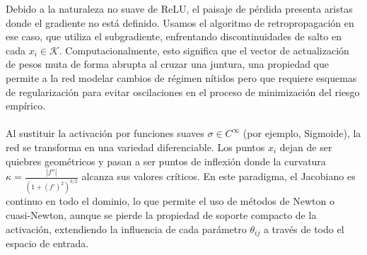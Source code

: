 \documentclass{article}
\begin{document}
Debido a la naturaleza no suave de ReLU, el paisaje de pérdida presenta aristas donde el gradiente no está definido. Usamos el algoritmo de retropropagación en ese caso, que utiliza el subgradiente, enfrentando discontinuidades de salto en cada $x_i \in \mathcal{K}$. Computacionalmente, esto significa que el vector de actualización de pesos muta de forma abrupta al cruzar una juntura, una propiedad que permite a la red modelar cambios de régimen nítidos pero que requiere esquemas de regularización para evitar oscilaciones en el proceso de minimización del riesgo empírico. \\ \\
Al sustituir la activación por funciones suaves $\sigma \in C^\infty$ (por ejemplo, Sigmoide), la red se transforma en una variedad diferenciable. Los puntos $x_i$ dejan de ser quiebres geométricos y pasan a ser puntos de inflexión donde la curvatura $\kappa = \frac{|f''|}{(1+(f')^2)^{3/2}}$ alcanza sus valores críticos. En este paradigma, el Jacobiano es continuo en todo el dominio, lo que permite el uso de métodos de Newton o cuasi-Newton, aunque se pierde la propiedad de soporte compacto de la activación, extendiendo la influencia de cada parámetro $\theta_{ij}$ a través de todo el espacio de entrada.
\end{document}
